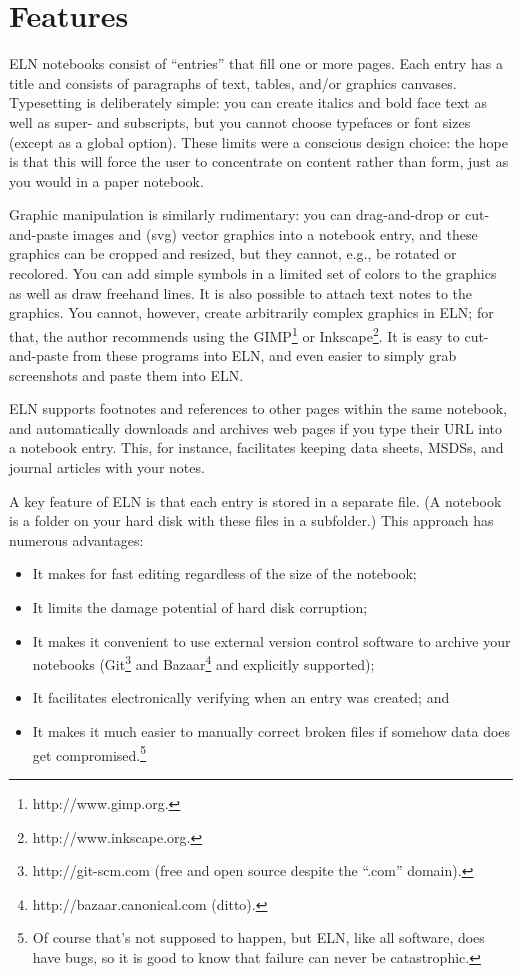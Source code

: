 \documentclass[11pt]{report}
\begin{document}
\section{Features}

ELN notebooks consist of ``entries'' that fill one or more pages.
Each entry has a title and consists of paragraphs of text, tables, and/or
graphics canvases. Typesetting is deliberately simple: you can create italics
and bold face text as well as super- and subscripts, but you cannot
choose typefaces or font sizes (except as a global option). These
limits were a conscious design choice: the hope is that this will
force the user to concentrate on content rather than form, just as you
would in a paper notebook.

Graphic manipulation is similarly rudimentary: you can drag-and-drop
or cut-and-paste images and (svg) vector graphics into a notebook
entry, and these graphics can be cropped and resized, but they cannot,
e.g., be rotated or recolored. You can add simple symbols in a limited
set of colors to the graphics as well as draw freehand lines. It is also
possible to attach text notes to the graphics. You cannot, however,
create arbitrarily complex graphics in ELN; for that, the author
recommends using the GIMP\footnote{http://www.gimp.org.} or
Inkscape\footnote{http://www.inkscape.org.}. It is easy to
cut-and-paste from these programs into ELN, and even easier to simply
grab screenshots and paste them into ELN.

ELN supports footnotes and references to other pages within the same
notebook, and automatically downloads and archives web pages if you
type their URL into a notebook entry. This, for instance, facilitates
keeping data sheets, MSDSs, and journal articles with your notes.

A key feature of ELN is that each entry is stored in a separate
file. (A notebook is a folder on your hard disk with these files in a
subfolder.) This approach has numerous advantages:
\begin{itemize}
  \item It makes for fast
editing regardless of the size of the notebook;
\item It limits the damage
potential of hard disk corruption;
\item It makes it convenient to use
external version control software to archive your notebooks
(Git\footnote{http://git-scm.com (free and open source despite the
  ``.com'' domain).} and Bazaar\footnote{http://bazaar.canonical.com (ditto).} and
explicitly supported);
\item It facilitates electronically verifying when an
entry was created; and
\item It makes it much easier to manually correct
broken files if somehow data does get compromised.\footnote{Of course
  that's not supposed to happen, but ELN, like all software, does have
  bugs, so it is good to know that failure can never be catastrophic.}
\end{itemize}
\end{document}

